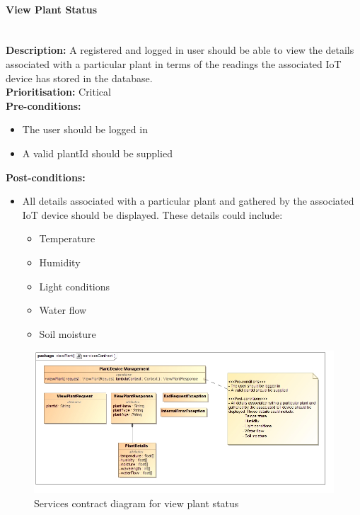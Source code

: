 \documentclass{article}
\begin{document}
\paragraph{View Plant Status}\mbox{}\\
\textbf{Description:} A registered and logged in user should be able to view the details associated with a particular plant in terms of the readings the associated IoT device has stored in the database.\\
\textbf{Prioritisation:} Critical\\		
\textbf{Pre-conditions:}
\begin{itemize}
	\item The user should be logged in
	\item A valid plantId should be supplied
\end{itemize}
\textbf{Post-conditions:}
\begin{itemize}
	\item All details associated with a particular plant and gathered by the associated IoT device should be displayed. These details could include:
	\begin{itemize}
		\item Temperature
		\item Humidity
		\item Light conditions
		\item Water flow
		\item Soil moisture
	\end{itemize}
\end{itemize}

\begin{figure}[H]
	\includegraphics[width=\linewidth]{images/ServicesContracts/viewPlant.jpg}
	\caption{Services contract diagram for view plant status}
\end{figure}
\end{document}
